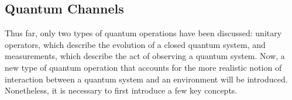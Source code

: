 








\subsection{Quantum Channels} \label{subsec:quantum_channels}


Thus far, only two types of quantum operations have been discussed: unitary operators, which describe the evolution of a closed quantum system, and measurements, which describe the act of observing a quantum system. Now, a new type of quantum operation that accounts for the more realistic notion of interaction between a quantum system and an environment will be introduced. Nonetheless, it is necessary to first introduce a few key concepts.



